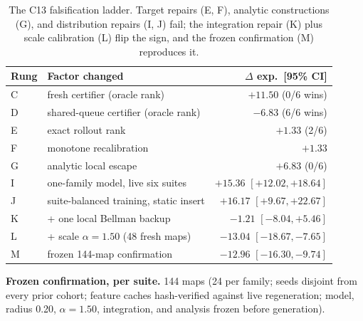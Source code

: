\documentclass[letterpaper]{article} %
\newcommand{\stage}[1]{\textsc{#1}}
\begin{document}
\begin{table}[h]
\centering
\scriptsize
\setlength{\tabcolsep}{3pt}
\begin{tabular}{@{}llr@{}}
\toprule
Rung & Factor changed & $\Delta$ exp.\ [95\% CI] \\
\midrule
C & fresh certifier (oracle rank) & $+11.50$ (0/6 wins) \\
D & shared-queue certifier (oracle rank) & $-6.83$ (6/6 wins) \\
E & exact rollout rank & $+1.33$ (2/6) \\
F & monotone recalibration & $+1.33$ \\
G & analytic local escape & $+6.83$ (0/6) \\
I & one-family model, live six suites & $+15.36$ $[+12.02,+18.64]$ \\
J & suite-balanced training, static insert & $+16.17$ $[+9.67,+22.67]$ \\
K & + one local Bellman backup & $-1.21$ $[-8.04,+5.46]$ \\
L & + scale $\alpha{=}1.50$ (48 fresh maps) & $-13.04$ $[-18.67,-7.65]$ \\
M & frozen 144-map confirmation & $-12.96$ $[-16.30,-9.74]$ \\
\bottomrule
\end{tabular}
\caption{The \stage{C13} falsification ladder. Target repairs (E, F), analytic constructions (G), and distribution repairs (I, J) fail; the integration repair (K) plus scale calibration (L) flip the sign, and the frozen confirmation (M) reproduces it.}
\label{tab:c13ladder}
\end{table}

\textbf{Frozen confirmation, per suite.} 144 maps (24 per family; seeds disjoint from every prior cohort; feature caches hash-verified against live regeneration; model, radius 0.20, $\alpha{=}1.50$, integration, and analysis frozen before generation).
\end{document}
